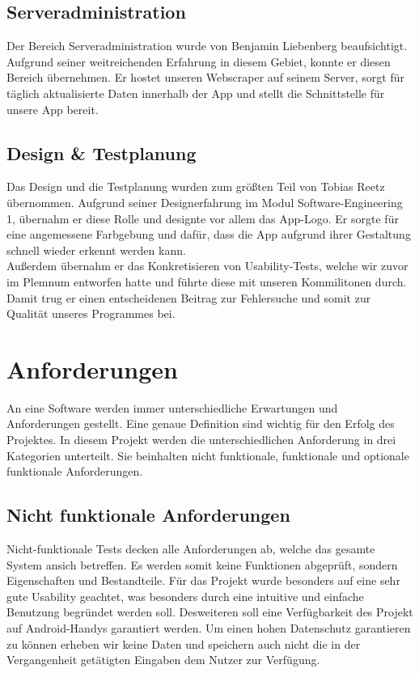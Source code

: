 \documentclass[conference]{IEEEtran}
\begin{document}
\subsection{Serveradministration}
Der Bereich Serveradministration wurde von Benjamin Liebenberg beaufsichtigt. Aufgrund seiner weitreichenden Erfahrung in diesem Gebiet, konnte er diesen Bereich übernehmen. Er hostet unseren Webscraper auf seinem Server, sorgt für täglich aktualisierte Daten innerhalb der App und stellt die Schnittstelle für unsere App bereit.

\subsection{Design \& Testplanung}
Das Design und die Testplanung wurden zum größten Teil von Tobias Reetz übernommen. Aufgrund seiner Designerfahrung im Modul Software-Engineering 1, übernahm er diese Rolle und designte vor allem das App-Logo. Er sorgte für eine angemessene Farbgebung und dafür, dass die App aufgrund ihrer Gestaltung schnell wieder erkennt werden kann. \\
Außerdem übernahm er das Konkretisieren von Usability-Tests, welche wir zuvor im Plemnum entworfen hatte und führte diese mit unseren Kommilitonen durch. Damit trug er einen entscheidenen Beitrag zur Fehlersuche und somit zur Qualität unseres Programmes bei.

\section{Anforderungen}
An eine Software werden immer unterschiedliche Erwartungen und Anforderungen gestellt. Eine genaue Definition sind wichtig für den Erfolg des Projektes. In diesem Projekt werden die unterschiedlichen Anforderung in drei Kategorien unterteilt. Sie beinhalten nicht funktionale, funktionale und optionale funktionale Anforderungen.

\subsection{Nicht funktionale Anforderungen}
Nicht-funktionale Tests decken alle Anforderungen ab, welche das gesamte System ansich betreffen. Es werden somit keine Funktionen abgeprüft, sondern Eigenschaften und Bestandteile. Für das Projekt wurde besonders auf eine sehr gute Usability geachtet, was besonders durch eine intuitive und einfache Benutzung begründet werden soll.
Desweiteren soll eine Verfügbarkeit des Projekt auf Android-Handys garantiert werden. Um einen hohen Datenschutz garantieren zu können erheben wir keine Daten und speichern auch nicht die in der Vergangenheit getätigten Eingaben dem Nutzer zur Verfügung. 
\end{document}
